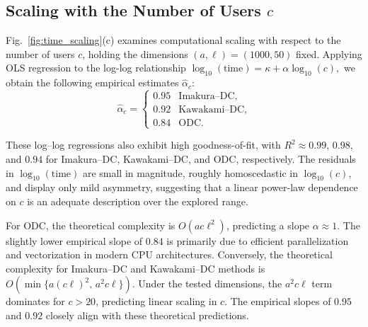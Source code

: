 \documentclass[final,3p,times]{elsarticle}
\theoremstyle{plain}
\begin{document}
\subsection{Scaling with the Number of Users \texorpdfstring{\(c\)}{c}}
\label{subsec:scaling-c}

Fig.~\ref{fig:time_scaling}(c) examines computational scaling with respect to the number of users \(c\), holding the dimensions \((a, \ell) = (1000, 50)\) fixed. Applying OLS regression to the log-log relationship
\(
\log_{10}(\text{time}) = \kappa + \alpha \log_{10}(c),
\)
we obtain the following empirical estimates \(\widehat{\alpha}_{c}\):
\begin{equation}
\widehat{\alpha}_{c} =
\begin{cases}
0.95 & \text{Imakura--DC},\\[2pt]
0.92 & \text{Kawakami--DC},\\[2pt]
0.84 & \text{ODC}.
\end{cases}
\end{equation}

These log--log regressions also exhibit high goodness-of-fit, with \(R^2 \approx 0.99\), \(0.98\), and \(0.94\) for Imakura--DC, Kawakami--DC, and ODC, respectively. The residuals in \(\log_{10}(\text{time})\) are small in magnitude, roughly homoscedastic in \(\log_{10}(c)\), and display only mild asymmetry, suggesting that a linear power-law dependence on \(c\) is an adequate description over the explored range.

For ODC, the theoretical complexity is \(O(a c \ell^2)\), predicting a slope \(\alpha \approx 1\). The slightly lower empirical slope of \(0.84\) is primarily due to efficient parallelization and vectorization in modern CPU architectures. Conversely, the theoretical complexity for Imakura--DC and Kawakami--DC methods is \(O(\min\{a(c\ell)^2,\, a^2c\ell\})\). Under the tested dimensions, the \(a^2 c \ell\) term dominates for \(c > 20\), predicting linear scaling in \(c\). The empirical slopes of \(0.95\) and \(0.92\) closely align with these theoretical predictions.
\end{document}

